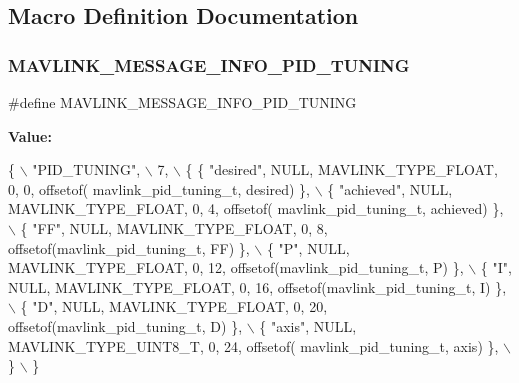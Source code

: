 \subsection{Macro Definition Documentation}
\mbox{\label{mavlink__msg__pid__tuning_8h_a7e1f8fb066ddf68741cf2f312a204818}} 
\subsubsection{M\+A\+V\+L\+I\+N\+K\+\_\+\+M\+E\+S\+S\+A\+G\+E\+\_\+\+I\+N\+F\+O\+\_\+\+P\+I\+D\+\_\+\+T\+U\+N\+I\+NG}
{\footnotesize\ttfamily \#define M\+A\+V\+L\+I\+N\+K\+\_\+\+M\+E\+S\+S\+A\+G\+E\+\_\+\+I\+N\+F\+O\+\_\+\+P\+I\+D\+\_\+\+T\+U\+N\+I\+NG}

{\bfseries Value\+:}
\begin{DoxyCode}
\{ \(\backslash\)
    \textcolor{stringliteral}{"PID\_TUNING"}, \(\backslash\)
    7, \(\backslash\)
    \{  \{ \textcolor{stringliteral}{"desired"}, NULL, MAVLINK_TYPE_FLOAT, 0, 0, offsetof(
      mavlink_pid_tuning_t, desired) \}, \(\backslash\)
         \{ \textcolor{stringliteral}{"achieved"}, NULL, MAVLINK_TYPE_FLOAT, 0, 4, offsetof(
      mavlink_pid_tuning_t, achieved) \}, \(\backslash\)
         \{ \textcolor{stringliteral}{"FF"}, NULL, MAVLINK_TYPE_FLOAT, 0, 8, offsetof(mavlink_pid_tuning_t, FF) \}, \(\backslash\)
         \{ \textcolor{stringliteral}{"P"}, NULL, MAVLINK_TYPE_FLOAT, 0, 12, offsetof(mavlink_pid_tuning_t, P) \}, \(\backslash\)
         \{ \textcolor{stringliteral}{"I"}, NULL, MAVLINK_TYPE_FLOAT, 0, 16, offsetof(mavlink_pid_tuning_t, I) \}, \(\backslash\)
         \{ \textcolor{stringliteral}{"D"}, NULL, MAVLINK_TYPE_FLOAT, 0, 20, offsetof(mavlink_pid_tuning_t, D) \}, \(\backslash\)
         \{ \textcolor{stringliteral}{"axis"}, NULL, MAVLINK_TYPE_UINT8_T, 0, 24, offsetof(
      mavlink_pid_tuning_t, axis) \}, \(\backslash\)
         \} \(\backslash\)
\}
\end{DoxyCode}
\mbox{\label{mavlink__msg__pid__tuning_8h_afb62406277fdbcb2b8d3e9fb5040f23a}} 
